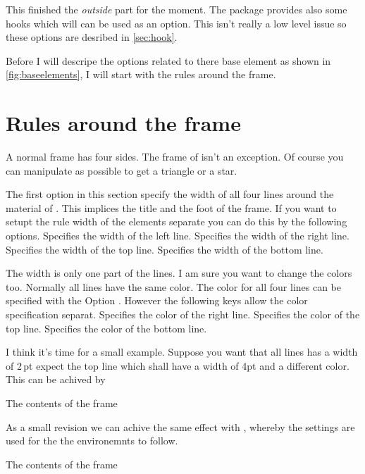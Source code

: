 \documentclass[openany,12pt,tocdepth=3]{ltx-md}
\begin{document}
\vspace*{\baselineskip}
This finished the \emph{outside} part for the moment. The package provides also some hooks
which will can be used as an option. This isn't really a low level issue so these
options are desribed in \autoref{sec:hook}. 

\vspace*{\baselineskip}
Before I will descripe the options related to there base element as shown in \autoref{fig:baseelements}, 
I will start with the rules around the frame.

\section{Rules around the frame}\label{sec:lines}
A normal frame has four sides. The frame of  isn't an exception. Of course
you can manipulate as possible to get a triangle or a star.

The first option in this section specify the width of all four lines around the material of .
This implices the title and the foot of the frame. If you want to setupt the rule width of the elements
separate you can do this by the following options.
Specifies the width of the left line.
Specifies the width of the right line.
Specifies the width of the top line.
Specifies the width of the bottom line.

The width is only one part of the lines. I am sure you want to change the colors too. 
Normally all lines have the same color. The color for all four lines can be specified 
with the Option . However the following keys allow the color
specification separat.
Specifies the color of the right line.
Specifies the color of the top line.
Specifies the color of the bottom line.


I think it's time for a small example. Suppose you want that all lines has a width of
2\,pt expect the top line which shall have a width of 4pt and a different color.
This can be achived by
\begin{ltxexample}[caption=Example outer part,label=outer,result=true,]
 \begin{xframed}[line-width=2pt,line-width-top=4pt,
          line-color-top=blue]
   The contents of the frame
 \end{xframed}
\end{ltxexample}
As a small revision we can achive the same effect with , 
whereby the settings are used for the the environemnts  to follow.
\begin{ltxexample}[caption={Example outer part II},]
 \xframedsetup[line-width=2pt,line-width-top=4pt
           ,line-color-top=blue]
 \begin{xframed}
   The contents of the frame
 \end{xframed}
\end{ltxexample}
\end{document}
